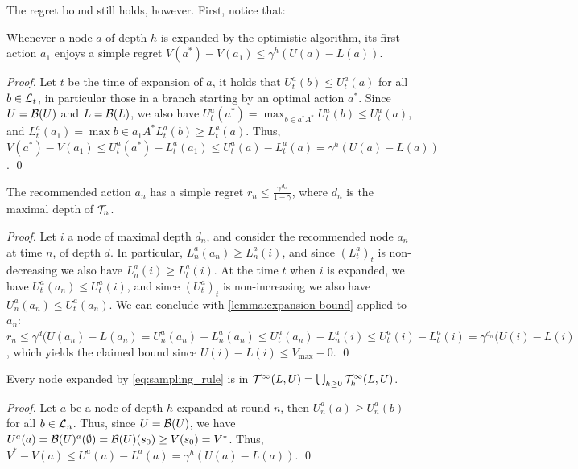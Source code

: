 \documentclass[runningheads]{llncs}
\begin{document}
The regret bound still holds, however. First, notice that:
\begin{lemma}
\label{lemma:expansion-bound}
Whenever a node $a$ of depth $h$ is expanded by the optimistic algorithm, its first action $a_1$ enjoys a simple regret $V(a^*)-V(a_1) \leq \gamma^h(U(a)-L(a))$. 
\end{lemma}
\begin{proof}
Let $t$ be the time of expansion of $a$, it holds that $U^a_t(b) \leq U^a_t(a)$ for all $b\in \mathcal{L}_t$, in particular those in a branch starting by an optimal action $a^*$. Since $U=\mathcal{B}(U)$ and $L=\mathcal{B}(L)$, we also have $U^a_t(a^*) = \max_{b\in a^*A^*} U^a_t(b) \leq U^a_t(a)$, and $L^a_t(a_1) = \max{b\in a_1 A^*} L^a_t(b) \geq  L^a_t(a)$. Thus, $V(a^*)-V(a_1) \leq U^a_t(a^*) - L^a_t(a_1) \leq U^a_t(a) - L^a_t(a) = \gamma^h(U(a)-L(a))$.
\qed\end{proof}
 
\begin{lemma}
The recommended action $a_n$ has a simple regret $r_n \leq \frac{\gamma^{d_n}}{1-\gamma}$, where $d_n$ is the maximal depth of $\mathcal{T}_n$.
\end{lemma}
\begin{proof}
Let $i$ a node of maximal depth $d_n$, and consider the recommended node $a_n$ at time $n$, of depth $d$. In particular, $L^a_n(a_n) \geq L^a_n(i)$, and since $(L^a_t)_t$ is non-decreasing we also have $L^a_n(i) \geq L^a_t(i)$. At the time $t$ when $i$ is expanded, we have $U^a_t(a_n) \leq U^a_t(i)$, and since $(U^a_t)_t$ is non-increasing we also have $U^a_n(a_n) \leq U^a_t(a_n)$. We can conclude with \autoref{lemma:expansion-bound} applied to $a_n$: $r_n \leq \gamma^d(U(a_n)-L(a_n) = U^a_n(a_n) - L^a_n(a_n)  \leq U^a_t(a_n) - L^a_n(i) \leq U^a_t(i) - L^a_t(i) = \gamma^{d_n}(U(i) - L(i)$, which yields the claimed bound since $U(i) - L(i) \leq V_{\max}-0$.
\qed\end{proof}

\begin{lemma}
\label{lemma:expansion-tree}
Every node expanded by \eqref{eq:sampling_rule} is in $\mathcal{T}^\infty(L,U) = \bigcup_{h\geq 0} \mathcal{T}^\infty_h(L,U)$.
\end{lemma}
\begin{proof}
Let $a$ be a node of depth $h$ expanded at round $n$, then $U^a_n(a) \geq U^a_n(b)$ for all $b\in\mathcal{L}_n$. Thus, since $U = \mathcal{B}(U)$, we have $U^a(a) = \mathcal{B}(U)^a(\emptyset) = \mathcal{B}(U)(s_0) \geq V(s_0) = V^*$. Thus, $V^* - V(a) \leq U^a(a) - L^a(a) = \gamma^h(U(a) - L(a))$.
\qed\end{proof}
\end{document}
